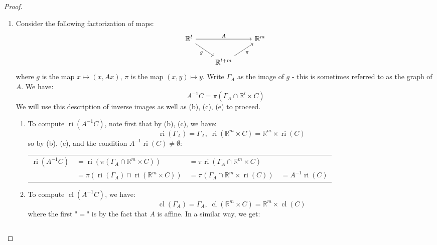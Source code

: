 \begin{proof}
\begin{enumerate}[label=(\alph*)]
\begin{enumerate}[label=(\roman*)]
		      \end{enumerate}
		\item Consider the following factorization of maps:
		      \[
			      \begin{tikzcd}
				      \mathbb{R}^l \arrow[rr,"A"]\arrow[dr,swap,"g"] &&\mathbb{R}^{m}\\
				      &\mathbb{R}^{l+m}\arrow[ru,swap,"\pi"]&
			      \end{tikzcd}
		      \]
		      where $g$ is the map $x\mapsto (x,Ax)$, $\pi$ is the map $(x, y)\mapsto y$. Write $\Gamma_A$ as the image of $g$ - this is sometimes referred to as the graph of $A$. We have:
		      \[
			      A^{-1}C=\pi (\Gamma_A\cap \mathbb{R}^l\times C)
		      \]
		      We will use this description of inverse images as well as (b), (c), (e) to proceed.
		      \begin{enumerate}[label=(\roman*)]
			      \item To compute $\operatorname{ri}(A^{-1}C)$, note first that by (b), (c), we have:
			            \[
				            \operatorname{ri}(\Gamma_A)=\Gamma_A,\; \operatorname{ri}(\mathbb{R}^m\times C)= \mathbb{R}^m \times \operatorname{ri}(C)
			            \]
			            so by (b), (e), and the condition $A^{-1}\operatorname{ri}(C)\neq\emptyset$:
			            \begin{center}
				            \begin{tabular}{llll}
					            $\operatorname{ri}(A^{-1}C)$ & $=\operatorname{ri}(\pi (\Gamma_A\cap \mathbb{R}^m\times C))$                      & $=\pi \operatorname{ri}(\Gamma_A\cap \mathbb{R}^m\times C)$                                     \\
					                                         & $=\pi (\operatorname{ri}( \Gamma_A )\cap \operatorname{ri}(\mathbb{R}^m\times C))$ & $=\pi ( \Gamma_A \cap \mathbb{R}^m\times \operatorname{ri}(C))$ & $=A^{-1}\operatorname{ri}(C)$
				            \end{tabular}
			            \end{center}
			      \item To compute $\operatorname{cl}(A^{-1}C)$, we have:
			            \[
				            \operatorname{cl}(\Gamma_A)=\Gamma_A,\; \operatorname{cl}(\mathbb{R}^m\times C)= \mathbb{R}^m \times \operatorname{cl}(C)
			            \]
			            where the first "$=$" is by the fact that $A$ is affine. In a similar way, we get:
			            \begin{center}
				            \begin{tabular}{llll}

\end{tabular}
\end{center}
\end{enumerate}
\end{enumerate}
\end{proof}
